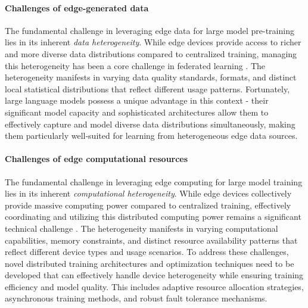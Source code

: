 
\paragraph{Challenges of edge-generated data} The fundamental challenge in leveraging edge data for large model pre-training lies in its inherent \textit{data heterogeneity}. While edge devices provide access to richer and more diverse data distributions compared to centralized training, managing this heterogeneity has been a core challenge in federated learning \cite {mcmahan2017communication}. The heterogeneity manifests in varying data quality standards, formats, and distinct local statistical distributions that reflect different usage patterns. Fortunately, large language models possess a unique advantage in this context - their significant model capacity and sophisticated architectures allow them to effectively capture and model diverse data distributions simultaneously, making them particularly well-suited for learning from heterogeneous edge data sources.


\paragraph{Challenges of edge computational resources} The fundamental challenge in leveraging edge computing for large model training lies in its inherent \textit{computational heterogeneity}. While edge devices collectively provide massive computing power compared to centralized training, effectively coordinating and utilizing this distributed computing power remains a significant technical challenge \cite{kairouz2021advances}.
The heterogeneity manifests in varying computational capabilities, memory constraints, and distinct resource availability patterns that reflect different device types and usage scenarios. 
To address these challenges, novel distributed training architectures and optimization techniques need to be developed that can effectively handle device heterogeneity while ensuring training efficiency and model quality. This includes adaptive resource allocation strategies, asynchronous training methods, and robust fault tolerance mechanisms.



